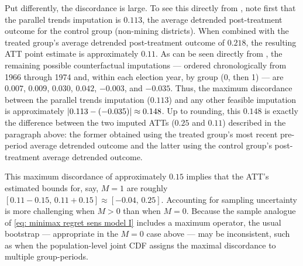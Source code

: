 \documentclass[twoside,11pt]{article}
\begin{document}
Put differently, the discordance is large. To see this directly from , note first that the parallel trends imputation is $0.113$, the average detrended post-treatment outcome for the control group (non-mining districts). When combined with the treated group's average detrended post-treatment outcome of $0.218$, the resulting \textrm{ATT} point estimate is approximately $0.11$. As can be seen directly from , the remaining possible counterfactual imputations --- ordered chronologically from 1966 through 1974 and, within each election year, by group (0, then 1) --- are $0.007$, $0.009$, $0.030$, $0.042$, $-0.003$, and $-0.035$. Thus, the maximum discordance between the parallel trends imputation ($0.113$) and any other feasible imputation is approximately $\lvert0.113 - (-0.035)\rvert \approx 0.148$. Up to rounding, this $0.148$ is exactly the difference between the two imputed \textrm{ATT}s ($0.25$ and $0.11$) described in the paragraph above: the former obtained using the treated group's most recent pre-period average detrended outcome and the latter using the control group's post-treatment average detrended outcome.

This maximum discordance of approximately $0.15$ implies that the \textrm{ATT}'s estimated bounds for, say, $M = 1$ are roughly $[0.11 - 0.15, \, 0.11 + 0.15] \approx [-0.04, \, 0.25]$. Accounting for sampling uncertainty is more challenging when $M > 0$ than when $M = 0$. Because the sample analogue of \eqref{eq: minimax regret sens model I} includes a maximum operator, the usual bootstrap --- appropriate in the $M = 0$ case above --- may be inconsistent, such as when the population-level joint CDF assigns the maximal discordance to multiple group-periods. 
\end{document}
